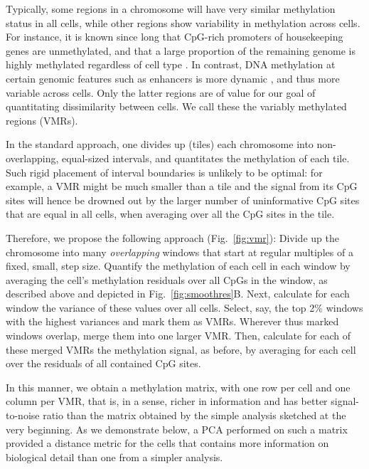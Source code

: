 \documentclass[twocolumn,10pt]{article}
\begin{document}
Typically, some regions in a chromosome will have very similar methylation status in all cells, while other regions show variability in methylation across cells.
For instance, it is known  since long that CpG-rich promoters of housekeeping genes are unmethylated, and that a large proportion of the remaining genome is highly methylated regardless of cell type \citep{bird1986cpg}.
In contrast, DNA methylation at certain genomic features such as enhancers is more dynamic \citep[e.g.,][]{argelaguet2019gastru}, and thus more variable across cells.
Only the latter regions are of value for our goal of quantitating dissimilarity between cells.
We call these the variably methylated regions (VMRs). %

In the standard approach, one divides up (tiles) each chromosome into non-overlapping, equal-sized intervals, and quantitates the methylation of each tile.
Such rigid placement of interval boundaries is unlikely to be optimal: for example, a VMR might be much smaller than a tile and the signal from its CpG sites will hence be drowned out by the larger number of uninformative CpG sites that are equal in all cells, when averaging over all the CpG sites in the tile.

Therefore, we propose the following approach (Fig.~\ref{fig:vmr}):
Divide up the chromosome into many \emph{overlapping} windows that start at regular multiples of a fixed, small, step size.
Quantify the methylation of each cell in each window by averaging the cell's methylation residuals over all CpGs in the window, as described above and depicted in Fig.~\ref{fig:smoothres}B.
Next, calculate for each window the variance of these values over all cells.
Select, say, the top 2\% windows with the highest variances and mark them as VMRs.
Wherever thus marked windows overlap, merge them into one larger VMR.
Then, calculate for each of these merged VMRs the methylation signal, as before, by averaging for each cell over the residuals of all contained CpG sites.

In this manner, we obtain a methylation matrix, with one row per cell and one column per VMR, that is, in a sense, richer in information and has better signal-to-noise ratio than the matrix obtained by the simple analysis sketched at the very beginning.
As we demonstrate below, a PCA performed on such a matrix provided a distance metric for the cells that contains more information on biological detail than one from a simpler analysis.
\end{document}
